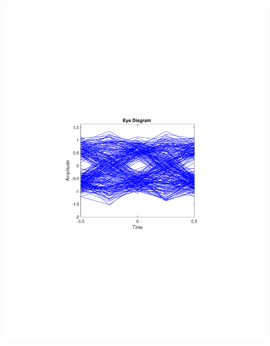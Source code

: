 \begin{refsection}
\begin{figure}[H]
\begin{minipage}{0.30\textwidth}
		\includegraphics[clip, trim=4cm 8cm 4cm 8cm, width=1\textwidth]{./sdf/m_qam_system/figures/expResults/homodyne/5_eye_16GBdInSig13dB_AfMIMO2.pdf}
		\label{fig:16GBdSpecMIMO2}
	\end{minipage}
	\begin{minipage}{0.30\textwidth}
		\centering

\end{minipage}
\end{figure}
\end{refsection}
